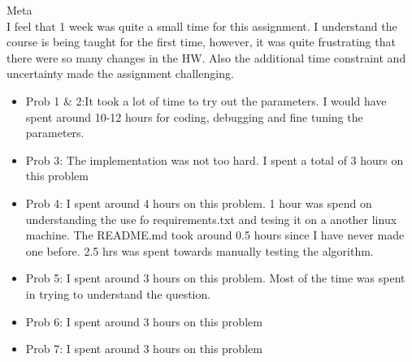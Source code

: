 \documentclass[12pt]{article}
\newenvironment{problem}[2][\large Problem]{\begin{trivlist}
\item[\hskip \labelsep {\bfseries #1}\hskip \labelsep {\bfseries #2.}]}{\end{trivlist}}
\begin{document}
\begin{problem} {8} Meta\\
I feel that 1 week was quite a small time for this assignment. I understand the course is being taught for the first time, however, it was quite frustrating that there were so many changes in the HW. Also the additional time constraint and uncertainty made the assignment challenging. 

\begin{itemize}
	\item Prob 1 \& 2:It took a lot of time to try out the parameters. I would have spent around 10-12 hours for coding, debugging and fine tuning the parameters.
	\item Prob 3: The implementation was not too hard. I spent a total of 3 hours on this problem
	\item Prob 4: I spent around 4 hours on this problem. 1 hour was spend on understanding the use fo requirements.txt and tesing it on a another linux machine. The README.md took around 0.5 hours since I have never made one before. 2.5 hrs was spent towards manually testing the algorithm.
	\item Prob 5: I spent around 3 hours on this problem. Most of the time was spent in trying to understand the question. 
	\item Prob 6: I spent around 3 hours on this problem 
	\item Prob 7: I spent around 3 hours on this problem
	
\end{itemize}


\end{problem}
\end{document}
